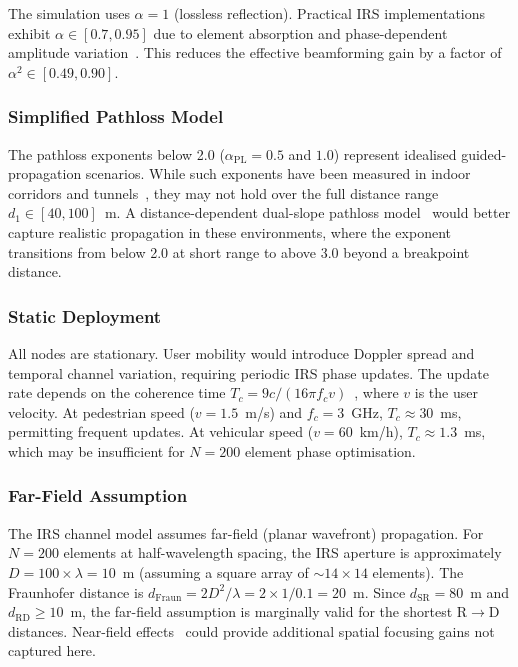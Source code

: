 \documentclass[journal]{IEEEtran} %
\begin{document}
The simulation uses $\alpha = 1$ (lossless reflection). Practical IRS implementations exhibit $\alpha \in [0.7, 0.95]$ due to element absorption and phase-dependent amplitude variation~\cite{tang2020irs_pathloss}. This reduces the effective beamforming gain by a factor of $\alpha^2 \in [0.49, 0.90]$.

\subsubsection{Simplified Pathloss Model}

The pathloss exponents below 2.0 ($\alpha_{\mathrm{PL}} = 0.5$ and $1.0$) represent idealised guided-propagation scenarios. While such exponents have been measured in indoor corridors and tunnels~\cite{molisch2006channel}, they may not hold over the full distance range $d_1 \in [40, 100]$~m. A distance-dependent dual-slope pathloss model~\cite{rappaport2015mmwave} would better capture realistic propagation in these environments, where the exponent transitions from below 2.0 at short range to above 3.0 beyond a breakpoint distance.

\subsubsection{Static Deployment}

All nodes are stationary. User mobility would introduce Doppler spread and temporal channel variation, requiring periodic IRS phase updates. The update rate depends on the coherence time $T_c = 9c / (16\pi f_c v)$~\cite{goldsmith2005wireless}, where $v$ is the user velocity. At pedestrian speed ($v = 1.5$~m/s) and $f_c = 3$~GHz, $T_c \approx 30$~ms, permitting frequent updates. At vehicular speed ($v = 60$~km/h), $T_c \approx 1.3$~ms, which may be insufficient for $N = 200$ element phase optimisation.

\subsubsection{Far-Field Assumption}

The IRS channel model assumes far-field (planar wavefront) propagation. For $N = 200$ elements at half-wavelength spacing, the IRS aperture is approximately $D = 100 \times \lambda = 10$~m (assuming a square array of $\sim$$14 \times 14$ elements). The Fraunhofer distance is $d_{\mathrm{Fraun}} = 2D^2/\lambda = 2 \times 1 / 0.1 = 20$~m. Since $d_{\mathrm{SR}} = 80$~m and $d_{\mathrm{RD}} \geq 10$~m, the far-field assumption is marginally valid for the shortest R$\to$D distances. Near-field effects~\cite{cui2022nearfield} could provide additional spatial focusing gains not captured here.
\end{document}
